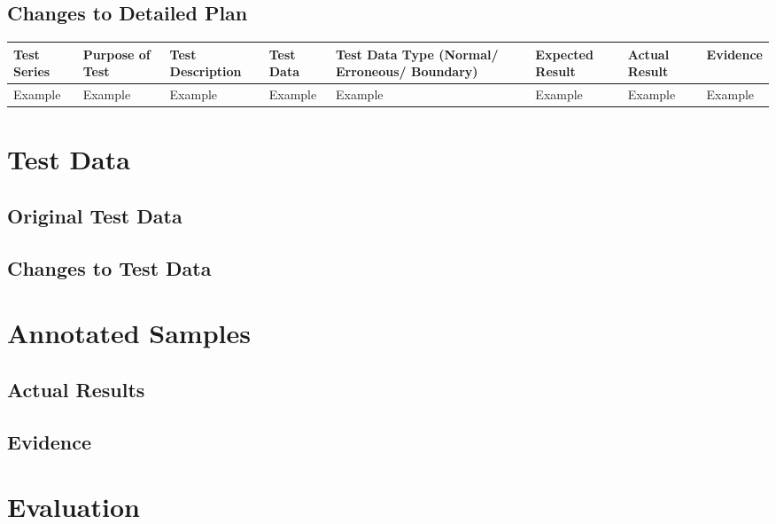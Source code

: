 \begin{landscape}
\begin{flushleft}
\begin{longtable}{|p{1.5cm}|p{2.5cm}|p{2.5cm}|p{2cm}|p{2cm}|p{2cm}|p{2cm}|p{2cm}|}
    \end{longtable}
\end{flushleft}

\subsection{Changes to Detailed Plan}

\begin{center}
    \begin{longtable}{|p{1.5cm}|p{2.5cm}|p{2.5cm}|p{2cm}|p{2cm}|p{2cm}|p{2cm}|p{2cm}|}
        \hline
        \textbf{Test Series} & \textbf{Purpose of Test} & \textbf{Test Description} & \textbf{Test Data} & \textbf{Test Data Type (Normal/ Erroneous/ Boundary)} & \textbf{Expected Result} & \textbf{Actual Result} & \textbf{Evidence}\\ \hline
        Example & Example & Example & Example & Example & Example & Example & Example \\ \hline
    \end{longtable}
\end{center}

\section{Test Data}

\subsection{Original Test Data}

\subsection{Changes to Test Data}

\section{Annotated Samples}

\subsection{Actual Results}
\end{landscape}

\subsection{Evidence}

\section{Evaluation}

